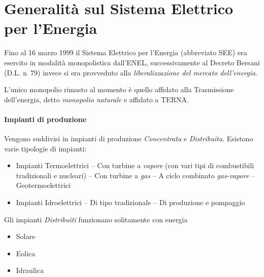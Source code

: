 \section{Generalità sul Sistema Elettrico per l'Energia}
Fino al 16 marzo 1999 il Sistema Elettrico per l'Energia (abbreviato SEE) era esercito in modalità
monopolistica dall'ENEL, successivamente al Decreto Bersani (D.L. n\textdegree\ 79) invece
si era provveduto alla \textit{liberalizzazione del mercato dell'energia}.

L'unico monopolio rimasto al momento è quello affidato alla Trasmissione dell'energia, detto
\textit{monopolio naturale} e affidato a TERNA.

\paragraph{Impianti di produzione}
Vengono suddivisi in impianti di produzione \textit{Concentrata} e \textit{Distribuita}.
Esistono varie tipologie di impianti:
\begin{itemize}
\item Impianti Termoelettrici
\subitem -- Con turbine a \textit{vapore} (con vari tipi di combustibili tradizionali e nucleari)
\subitem -- Con turbine a \textit{gas}
\subitem -- A ciclo combinato \textit{gas-vapore}
\subitem -- Geotermoelettrici
\item Impianti Idroelettrici
\subitem -- Di tipo tradizionale
\subitem -- Di produzione e pompaggio
\end{itemize}

Gli impianti \textit{Distribuiti} funzionano solitamente con energia
\begin{itemize}
\item Solare
\item Eolica
\item Idraulica
\end{itemize}

